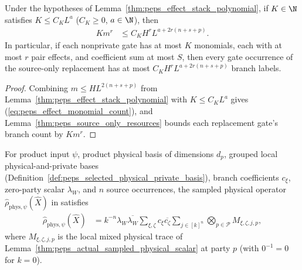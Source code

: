 \begin{lemma}
    \label{thm:peps_effect_replacement_polynomial}
    \leanok
    Under the hypotheses of Lemma~\ref{thm:peps_effect_stack_polynomial}, if
    $K\in\N$ satisfies $K\leq C_KL^a$ ($C_K\geq0$, $a\in\N$), then
    \begin{align}
        K m^r & \leq C_K H^r L^{a+2r(n+s+p)}.
        \label{eq:peps_effect_monomial_count}
    \end{align}
    In particular, if each nonprivate gate has at most $K$ monomials, each with
    at most $r$ pair effects, and coefficient sum at most $S$, then every gate
    occurrence of the source-only replacement has at most
    $C_K H^r L^{a+2r(n+s+p)}$ branch labels.
\end{lemma}
\begin{proof}
    \leanok
    Combining $m\le HL^{2(n+s+p)}$ from
    Lemma~\ref{thm:peps_effect_stack_polynomial} with $K\le C_KL^a$ gives
    (\ref{eq:peps_effect_monomial_count}), and
    Lemma~\ref{thm:peps_source_only_resources} bounds each replacement gate's
    branch count by $Km^r$.
\end{proof}

\begin{lemma}
    \label{thm:peps_actual_pure_sampled_physical_sum}
    \leanok
    For product input $\psi$, product physical basis of dimensions $d_p$,
    grouped local physical-and-private bases
    (Definition~\ref{def:peps_selected_physical_private_basis}), branch
    coefficients $c_\xi$, zero-party scalar $\lambda_W$, and $n$ source
    occurrences, the sampled physical operator
    $\widehat\rho_{\mathrm{phys},\psi}(\widehat X)$ in
    \cite[proof of Theorem~5.2]{OpenAI2026PolynomialPEPS} satisfies
    \begin{align}
        \widehat\rho_{\mathrm{phys},\psi}(\widehat X)
         & =k^{-n}\lambda_W\overline{\lambda_W}
        \sum_{\xi,\zeta}c_\xi\overline{c_\zeta}
        \sum_{j\in[k]^n}\bigotimes_{p\in\mathcal P}M_{\xi,\zeta,j,p},
        \label{eq:peps_actual_pure_sampled_physical_sum}
    \end{align}
    where $M_{\xi,\zeta,j,p}$ is the local mixed physical trace of
    Lemma~\ref{thm:peps_actual_sampled_physical_scalar} at party $p$ (with
    $0^{-1}=0$ for $k=0$).
\end{lemma}

